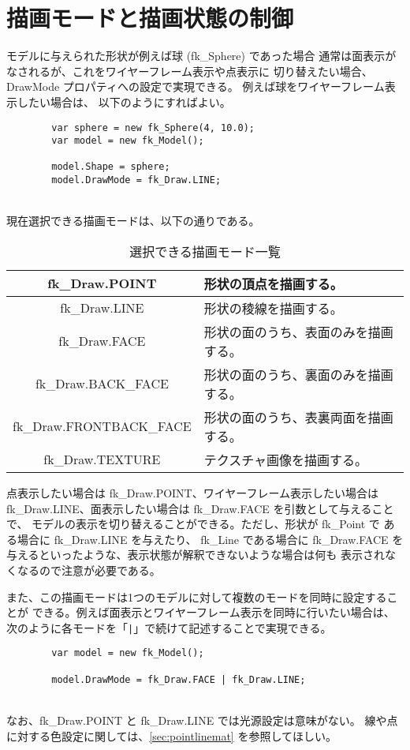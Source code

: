 \section{描画モードと描画状態の制御} \label{sec:drawmode}
モデルに与えられた形状が例えば球 (fk\_Sphere) であった場合
通常は面表示がなされるが、これをワイヤーフレーム表示や点表示に
切り替えたい場合、DrawMode プロパティへの設定で実現できる。
例えば球をワイヤーフレーム表示したい場合は、
以下のようにすればよい。
\\
\begin{breakbox}
\begin{verbatim}
        var sphere = new fk_Sphere(4, 10.0);
        var model = new fk_Model();

        model.Shape = sphere;
        model.DrawMode = fk_Draw.LINE;
\end{verbatim}
\end{breakbox}
~ \\
現在選択できる描画モードは、以下の通りである。
\begin{table}[H]
\caption{選択できる描画モード一覧}
\label{tbl:drawmode}
\begin{center}
\begin{tabular}{|c|l|}
\hline
fk\_Draw.POINT & 形状の頂点を描画する。\\ \hline
fk\_Draw.LINE & 形状の稜線を描画する。\\ \hline
fk\_Draw.FACE & 形状の面のうち、表面のみを描画する。\\ \hline
fk\_Draw.BACK\_FACE & 形状の面のうち、裏面のみを描画する。\\ \hline
fk\_Draw.FRONTBACK\_FACE & 形状の面のうち、表裏両面を描画する。\\ \hline
fk\_Draw.TEXTURE & テクスチャ画像を描画する。\\ \hline
\end{tabular}
\end{center}
\end{table}

点表示したい場合は fk\_Draw.POINT、ワイヤーフレーム表示したい場合は
fk\_Draw.LINE、面表示したい場合は fk\_Draw.FACE を引数として与えることで、
モデルの表示を切り替えることができる。ただし、形状が fk\_Point で
ある場合に fk\_Draw.LINE を与えたり、
fk\_Line である場合に fk\_Draw.FACE を与えるといったような、表示状態が解釈できないような場合は何も
表示されなくなるので注意が必要である。

また、この描画モードは1つのモデルに対して複数のモードを同時に設定することが
できる。例えば面表示とワイヤーフレーム表示を同時に行いたい場合は、
次のように各モードを「\verb+|+」で続けて記述することで実現できる。
\\
\begin{breakbox}
\begin{verbatim}
        var model = new fk_Model();

        model.DrawMode = fk_Draw.FACE | fk_Draw.LINE;
\end{verbatim}
\end{breakbox}
~ \\
なお、fk\_Draw.POINT と fk\_Draw.LINE では光源設定は意味がない。
線や点に対する色設定に関しては、\ref{sec:pointlinemat} を参照してほしい。

